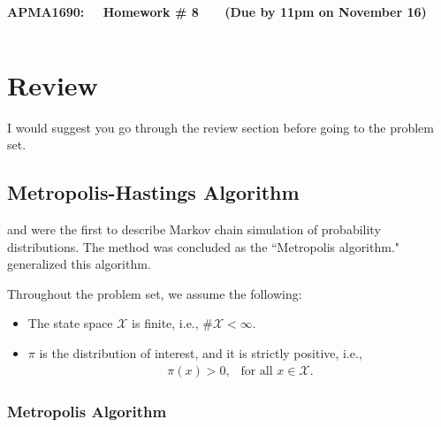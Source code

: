\documentclass[11pt,letterpaper, leqno]{article}
\numberwithin{equation}{section}
\numberwithin{theorem}{section}
\numberwithin{lemma}{section}
\numberwithin{corollary}{section}
\numberwithin{definition}{section}
\numberwithin{proposition}{section}
\numberwithin{remark}{section}
\numberwithin{example}{section}
\begin{document}
\begin{center}
{\bf \Large APMA1690: ~~Homework \# 8 ~~~(Due by 11pm on November 16)}
\end{center}
\[\]
\medskip

\section{Review}

I would suggest you go through the review section before going to the problem set.


\subsection{Metropolis-Hastings Algorithm}

\cite{metropolis1949monte} and \cite{metropolis1953equation} were the first to describe Markov chain simulation of probability distributions. The method was concluded as the ``Metropolis algorithm." \cite{hastings1970monte} generalized this algorithm.

Throughout the problem set, we assume the following:
\begin{itemize}
\item The state space $\mathcal{X}$ is finite, i.e., $\#\mathcal{X}<\infty$.
    \item $\pi$ is the distribution of interest, and it is strictly positive, i.e., 
\begin{align*}
    \pi(x)>0,\ \ \mbox{ for all }x\in\mathcal{X}.
\end{align*}
\end{itemize}


\subsubsection{Metropolis Algorithm}
\end{document}

